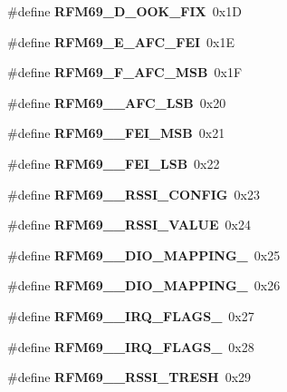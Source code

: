 \begin{DoxyCompactItemize}
\item 
\mbox{\label{_r_f_m69__registri_8h_afcf56ed9ec553e73a47571564ac9eeff}} 
\#define {\bfseries R\+F\+M69\+\_\+D\+\_\+\+O\+O\+K\+\_\+\+F\+IX}~0x1D
\item 
\mbox{\label{_r_f_m69__registri_8h_ae0ed461b3e70ea2581adbb30f1c35ff1}} 
\#define {\bfseries R\+F\+M69\+\_\+E\+\_\+\+A\+F\+C\+\_\+\+F\+EI}~0x1E
\item 
\mbox{\label{_r_f_m69__registri_8h_ae03069413842faef99a368eb433f3517}} 
\#define {\bfseries R\+F\+M69\+\_\+F\+\_\+\+A\+F\+C\+\_\+\+M\+SB}~0x1F
\item 
\mbox{\label{_r_f_m69__registri_8h_aacc2b75bf3f1ba9cfedf7b51e38797ab}} 
\#define {\bfseries R\+F\+M69\+\_\+\_\+\+A\+F\+C\+\_\+\+L\+SB}~0x20
\item 
\mbox{\label{_r_f_m69__registri_8h_abdf9576dc0507d33ffd7fea823f03c4f}} 
\#define {\bfseries R\+F\+M69\+\_\+\_\+\+F\+E\+I\+\_\+\+M\+SB}~0x21
\item 
\mbox{\label{_r_f_m69__registri_8h_a18c0469c67d8fb36a1f5ce4d966f7c7e}} 
\#define {\bfseries R\+F\+M69\+\_\+\_\+\+F\+E\+I\+\_\+\+L\+SB}~0x22
\item 
\mbox{\label{_r_f_m69__registri_8h_ab9a4e272dd9023293f785d344082b484}} 
\#define {\bfseries R\+F\+M69\+\_\+\_\+\+R\+S\+S\+I\+\_\+\+C\+O\+N\+F\+IG}~0x23
\item 
\mbox{\label{_r_f_m69__registri_8h_a8745dd569ba2d63d0a78f6e5d19a2bbf}} 
\#define {\bfseries R\+F\+M69\+\_\+\_\+\+R\+S\+S\+I\+\_\+\+V\+A\+L\+UE}~0x24
\item 
\mbox{\label{_r_f_m69__registri_8h_a6e96e779dda66d75aba62cad562adf8d}} 
\#define {\bfseries R\+F\+M69\+\_\+\_\+\+D\+I\+O\+\_\+\+M\+A\+P\+P\+I\+N\+G\+\_}~0x25
\item 
\mbox{\label{_r_f_m69__registri_8h_a539f7d02678f5969b88728424870f3df}} 
\#define {\bfseries R\+F\+M69\+\_\+\_\+\+D\+I\+O\+\_\+\+M\+A\+P\+P\+I\+N\+G\+\_}~0x26
\item 
\mbox{\label{_r_f_m69__registri_8h_a0a383c19113ce84622c9dbbb8ab3b226}} 
\#define {\bfseries R\+F\+M69\+\_\+\_\+\+I\+R\+Q\+\_\+\+F\+L\+A\+G\+S\+\_}~0x27
\item 
\mbox{\label{_r_f_m69__registri_8h_ac84ac0cc4c36a18e636bc7d14ffd9ff5}} 
\#define {\bfseries R\+F\+M69\+\_\+\_\+\+I\+R\+Q\+\_\+\+F\+L\+A\+G\+S\+\_}~0x28
\item 
\mbox{\label{_r_f_m69__registri_8h_ad2dc326df8fcc7f9a07da7dde7488c18}} 
\#define {\bfseries R\+F\+M69\+\_\+\_\+\+R\+S\+S\+I\+\_\+\+T\+R\+E\+SH}~0x29
\item 

\end{DoxyCompactItemize}
